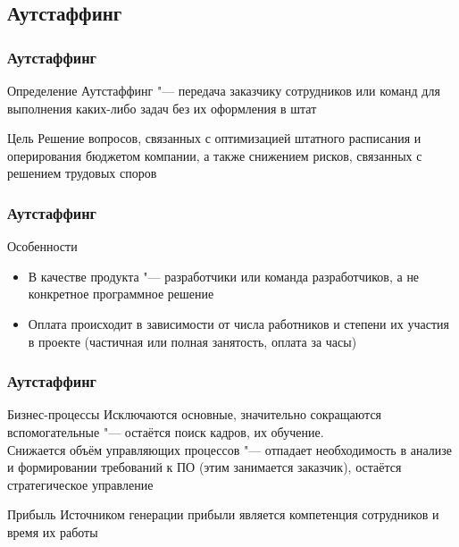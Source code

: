 \documentclass{../industrial-development}
\begin{document}
\subsection{Аутстаффинг}


\begin{frame} \frametitle{Аутстаффинг}
	\begin{block}{Определение}
		\alert{Аутстаффинг} "--- передача заказчику сотрудников или команд для выполнения каких-либо задач без их оформления в штат
	\end{block}
	\begin{block}{Цель}
		Решение вопросов, связанных с оптимизацией штатного расписания и оперирования бюджетом компании, а также снижением рисков, связанных с решением трудовых споров
	\end{block}
\end{frame}
\lecturenotes


\begin{frame} \frametitle{Аутстаффинг}
	\begin{block}{Особенности}
		\begin{itemize}
			\item В качестве продукта "--- разработчики или команда разработчиков, а не конкретное программное решение
			\item Оплата происходит в зависимости от числа работников и степени их участия в проекте (частичная или полная занятость, оплата за часы)
		\end{itemize}
	\end{block}
\end{frame}
\lecturenotes


\begin{frame} \frametitle{Аутстаффинг}
	\begin{block}{Бизнес-процессы}
		Исключаются основные, значительно сокращаются вспомогательные "--- остаётся поиск кадров, их обучение.\\
		Снижается объём управляющих процессов "--- отпадает необходимость в анализе и формировании требований к ПО (этим занимается заказчик), остаётся стратегическое управление
	\end{block}
	\begin{block}{Прибыль}
		Источником генерации прибыли является компетенция сотрудников и время их работы
	\end{block}
\end{frame}
\lecturenotes
\end{document}
